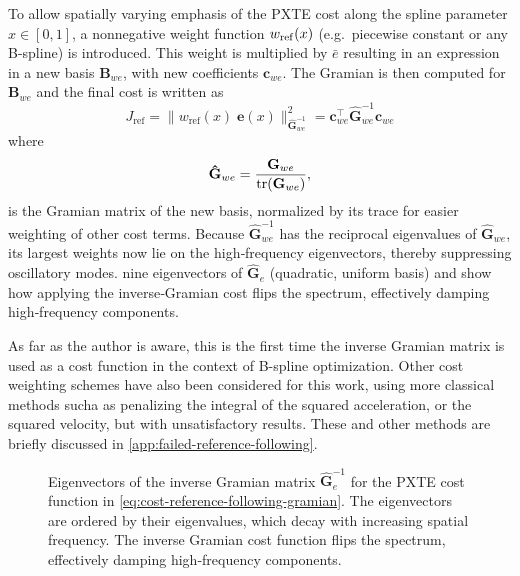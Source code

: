 To allow spatially varying emphasis of the PXTE cost along the spline parameter $x\in[0,1]$, a nonnegative weight function $w_{\rm ref}(x)$ (e.g.\ piecewise constant or any B-spline) is introduced. This weight is multiplied by $\bar e$ resulting in an expression in a new basis $\mathbf B_{we}$, with new coefficients $\mathbf c_{we}$. The Gramian is then computed for $\mathbf B_{we}$ and the final cost is written as
\begin{equation}\label{eq:cost-reference-following-gramian}
    J_\text{ref} = \|w_\text{ref}(x)\;\mathbf e(x)\|_{\mathbf{\hat G}_{we}^{-1}}^2 
    = \mathbf{c}_{we}^\top \mathbf{\hat G}_{we}^{-1} \mathbf{c}_{we}
\end{equation}
where
\begin{equation}\label{eq:gramian-density}
    \mathbf{\hat G}_{we} = \frac{\mathbf G_{we}}{\operatorname{tr}(\mathbf G_{we})}, 
\end{equation}
is the Gramian matrix of the new basis, normalized by its trace for easier weighting of other cost terms. 
Because $\mathbf{\hat G}_{we}^{-1}$ has the reciprocal eigenvalues of $\mathbf{\hat G}_{we}$, its largest weights now lie on the high‐frequency eigenvectors, thereby suppressing oscillatory modes.  nine eigenvectors of $\mathbf{\hat G}_e$ (quadratic, uniform basis) and show how applying the inverse‐Gramian cost flips the spectrum, effectively damping high‐frequency components.


As far as the author is aware, this is the first time the inverse Gramian matrix is used as a cost function in the context of B-spline optimization.
Other cost weighting schemes have also been considered for this work, using more classical methods sucha as penalizing the integral of the squared acceleration, or the squared velocity, but with unsatisfactory results. These and other methods are briefly discussed in \cref{app:failed-reference-following}.

\begin{figure}
    \centering
    
    \caption{Eigenvectors of the inverse Gramian matrix $\mathbf{\hat G}_e^{-1}$ for the PXTE cost function in \cref{eq:cost-reference-following-gramian}. The eigenvectors are ordered by their eigenvalues, which decay with increasing spatial frequency. The inverse Gramian cost function flips the spectrum, effectively damping high‐frequency components.}    
    \label{fig:inverse-gramian-eigenvectors}
\end{figure}


